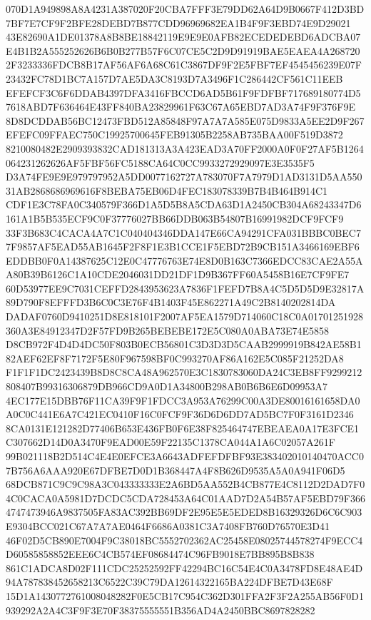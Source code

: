 \documentclass[UTF8,fontset=fandol,zihao=-4,a4paper]{ctexart}
\begin{document}
{{070D1A949898A8A4231A387020F20CBA7FFF3E79DD62A64D9B0667F412D3BD7BF7E7CF9F2BFE28DEBD7B877CDD96969682EA1B4F9F3EBD74E9D29021
43E82690A1DE01378A8B8BE18842119E9E9E0AFB82ECEDEDEBD6ADCBA07E4B1B2A555252626B6B0B277B57F6C07CE5C2D9D91919BAE5EAEA4A268720
2F3233336FDCB8B17AF56AF6A68C61C3867DF9F2E5FBF7EF4545456239E07F23432FC78D1BC7A157D7AE5DA3C8193D7A3496F1C286442CF561C11EEB
EFEFCF3C6F6DDAB4397DFA3416FBCCD6AD5B61F9FDFBF717689180774D57618ABD7F636464E43FF840BA23829961F63C67A65EBD7AD3A74F9F376F9E
8D8DCDDAB56BC12473FBD512A85848F97A7A7A585E075D9833A5EE2D9F267EFEFC09FFAEC750C19925700645FEB91305B2258AB735BAA00F519D3872
8210080482E2909393832CAD181313A3A423EAD3A70FF2000A0F0F27AF5B1264064231262626AF5FBF56FC5188CA64C0CC9933272929097E3E3535F5
D3A74FE9E9E979797952A5DD0077162727A783070F7A7979D1AD3131D5AA55031AB2868686969616F8BEBA75EB06D4FEC183078339B7B4B464B914C1
CDF1E3C78FA0C340579F366D1A5D5B8A5CDA63D1A2450CB304A68243347D6161A1B5B535ECF9C0F37776027BB66DDB063B54807B16991982DCF9FCF9
33F3B683C4CACA4A7C1C040404346DDA147E66CA94291CFA031BBBC0BEC77F9857AF5EAD55AB1645F2F8F1E3B1CCE1F5EBD72B9CB151A3466169EBF6
EDDBB0F0A14387625C12E0C47776763E74E8D0B163C7366EDCC83CAE2A55AA80B39B6126C1A10CDE2046031DD21DF1D9B367FF60A5458B16E7CF9FE7
60D53977EE9C7031CEFFD2843953623A7836F1FEFD7B8A4C5D5D5D9E32817A89D790F8EFFFD3B6C0C3E76F4B1403F45E862271A49C2B8140202814DA
DADAF0760D9410251D8E818101F2007AF5EA1579D714060C18C0A01701251928360A3E84912347D2F57FD9B265BEBEBE172E5C080A0ABA73E74E5858
D8CB972F4D4D4DC50F803B0ECB56801C3D3D3D5CAAB2999919B842AE58B182AEF62EF8F7172F5E80F967598BF0C993270AF86A162E5C085F21252DA8
F1F1F1DC2423439B8D8C8CA48A962570E3C1830783060DA24C3EB8FF9299212808407B99316306879DB966CD9A0D1A34800B298AB0B6B6E6D09953A7
4EC177E15DBB76F11CA39F9F1FDCC3A953A76299C00A3DE80016161658DA0A0C0C441E6A7C421EC0410F16C0FCF9F36D6D6DD7AD5BC7F0F3161D2346
8CA0131E121282D77406B653E436FB0F6E38F825464747EBEAEA0A17E3FCE1C307662D14D0A3470F9EAD00E59F22135C1378CA044A1A6C02057A261F
99B021118B2D514C4E4E0EFCE3A6643ADFEFDFBF93E383402010140470ACC07B756A6AAA920E67DFBE7D0D1B368447A4F8B626D9535A5A0A941F06D5
68DCB871C9C9C98A3C043333333E2A6BD5AA552B4CB877E4C8112D2DAD7F04C0CACA0A5981D7DCDC5CDA728453A64C01AAD7D2A54B57AF5EBD79F366
4747473946A9837505FA83AC392BB69DF2E95E5E5EDED8B16329326D6C6C903E9304BCC021C67A7A7AE0464F6686A0381C3A7408FB760D76570E3D41
46F02D5CB890E7004F9C38018BC5552702362AC25458E08025744578274F9ECC4D60585858852EEE6C4CB574EF08684474C96FB9018E7BB895B8B838
861C1ADCA8D02F111CDC25252592FF42294BC16C54E4C0A3478FD8E48AE4D94A787838452658213C6522C39C79DA12614322165BA224DFBE7D43E68F
15D1A1430772761008048282F0E5CB17C954C362D301FFA2F3F2A255AB56F0D1939292A2A4C3F9F3E70F38375555551B356AD4A2450BBC8697828282
}}
\end{document}
